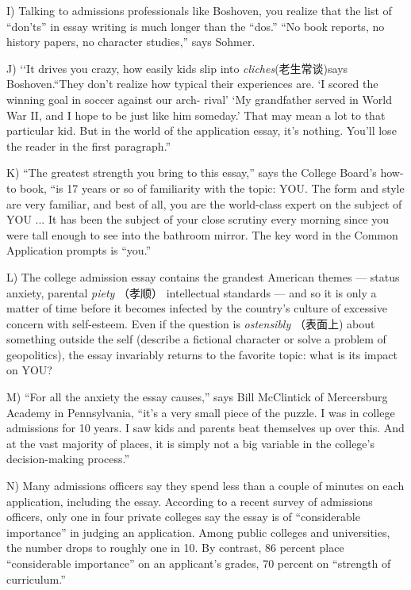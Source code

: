 \documentclass[UTF8,11pt]{ctexart}
\begin{document}
I) Talking to admissions professionals like Boshoven, you realize that the list of “don’ts” in essay writing is much longer than the “dos.” “No book reports, no history papers, no character studies,” says Sohmer.


J) ‘‘It drives you crazy, how easily kids slip into\textit{ cliches}(老生常谈)says Boshoven.“They don’t realize how typical their experiences are. ‘I scored the winning goal in soccer against our arch- rival’ ‘My grandfather served in World War II, and I hope to be just like him someday.’ That may mean a lot to that particular kid. But in the world of the application essay, it’s nothing. You’ll lose the reader in the first paragraph.”


K) “The greatest strength you bring to this essay,” says the College Board’s how-to book, “is 17 years or so of familiarity with the topic: YOU. The form and style are very familiar, and best of all, you are the world-class expert on the subject of YOU ... It has been the subject of your close scrutiny every morning since you were tall enough to see into the bathroom mirror. The key word in the Common Application prompts is “you.”


L) The college admission essay contains the grandest American themes — status anxiety, parental\textit{ piety} （孝顺） intellectual standards — and so it is only a matter of time before it becomes infected by the country’s culture of excessive concern with self-esteem. Even if the question is\textit{ ostensibly} （表面上) about something outside the self (describe a fictional character or solve a problem of geopolitics), the essay invariably returns to the favorite topic: what is its impact on YOU?


M) “For all the anxiety the essay causes,” says Bill McClintick of Mercersburg Academy in Pennsylvania, “it’s a very small piece of the puzzle. I was in college admissions for 10 years. I saw kids and parents beat themselves up over this. And at the vast majority of places, it is simply not a big variable in the college’s decision-making process.”


N) Many admissions officers say they spend less than a couple of minutes on each application, including the essay. According to a recent survey of admissions officers, only one in four private colleges say the essay is of “considerable importance” in judging an application. Among public colleges and universities, the number drops to roughly one in 10. By contrast, 86 percent place “considerable importance” on an applicant’s grades, 70 percent on “strength of curriculum.”
\end{document}
